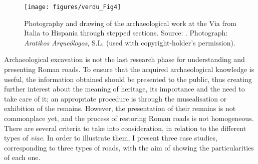 		\begin{figure}[!htb]
			\texttt{[image: figures/verdu\_Fig4]}
			\centering
			\caption{Photography and drawing of the archaeological work at the Via from Italia to Hispania through stepped sections. Source: \textcite[64]{Palomino_2010}. Photograph: \textit{Aratikos Arqueólogos}, S.L. (used with copyright-holder’s permission).}
			\label{fig:verdu_Fig4}
		\end{figure}	
Archaeological excavation is not the last research phase for understanding and presenting Roman roads. To ensure that the acquired archaeological knowledge is useful, the information obtained should be presented to the public, thus creating further interest about the meaning of heritage, its importance and the need to take care of it; an appropriate procedure is through the musealisation or exhibition of the remains. However, the presentation of their remains is not commonplace yet, and the process of restoring Roman roads is not homogeneous. There are several criteria to take into consideration, in relation to the different types of \textit{viae}. In order to illustrate them, I present three case studies, corresponding to three types of roads, with the aim of showing the particularities of each one. 


